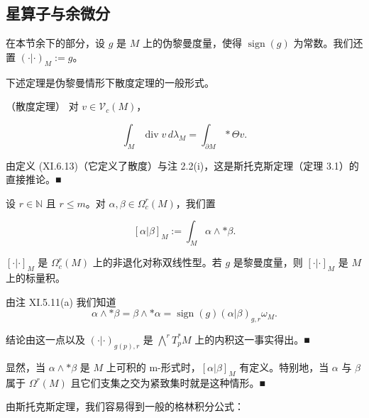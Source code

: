\subsection*{星算子与余微分}

在本节余下的部分，设 $ g $ 是 $ M $ 上的伪黎曼度量，使得 $ \operatorname{sign}(g) $ 为常数。我们还置 $ (\cdot|\cdot)_M := g $。

下述定理是伪黎曼情形下散度定理的一般形式。

\begin{theorem}

（散度定理） 对 $ v \in \mathcal{V}_c(M) $，

\[
\int_M \operatorname{div} v\, d\lambda_M = \int_{\partial M} \ast\Theta v .
\]

\proofhead
由定义 (XI.6.13)（它定义了散度）与注 2.2(i)，这是斯托克斯定理（定理 3.1）的直接推论。\nobreak\hspace{0.35em}■
\end{theorem}

设 $ r \in \mathbb{N} $ 且 $ r \le m $。对 $ \alpha, \beta \in \Omega_c^r(M) $，我们置

\[
[\alpha|\beta]_M := \int_M \alpha \wedge \ast\beta .
\]

\begin{remark}

$ [\cdot|\cdot]_M $ 是 $ \Omega_c^r(M) $ 上的非退化对称双线性型。若 $ g $ 是黎曼度量，则 $ [\cdot|\cdot]_M $ 是 $ M $ 上的标量积。

\proofhead
由注 XI.5.11(a) 我们知道
\[
\alpha \wedge \ast\beta = \beta \wedge \ast\alpha = \operatorname{sign}(g)(\alpha|\beta)_{g,r}\omega_M .
\]

结论由这一点以及 $ (\cdot|\cdot)_{g(p),r} $ 是 $ \bigwedge^r T_p^*M $ 上的内积这一事实得出。\nobreak\hspace{0.35em}■

\begin{items}
\item[（b）]

显然，当 $ \alpha \wedge \ast\beta $ 是 $ M $ 上可积的 m-形式时，$ [\alpha|\beta]_M $ 有定义。特别地，当 $ \alpha $ 与 $ \beta $ 属于 $ \Omega^r(M) $ 且它们支集之交为紧致集时就是这种情形。\nobreak\hspace{0.35em}■

\end{items}

由斯托克斯定理，我们容易得到一般的格林积分公式：

\end{remark}

